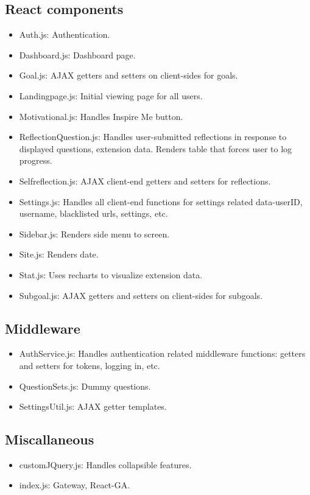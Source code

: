 \documentclass[letterpaper, 10 pt]{report}
\begin{document}
\subsection{React components}
\begin{itemize}
\item Auth.js: Authentication.
\item Dashboard.js: Dashboard page.
\item Goal.js: AJAX getters and setters on client-sides for goals.
\item Landingpage.js: Initial viewing page for all users.
\item Motivational.js: Handles Inspire Me button.
\item ReflectionQuestion.js: Handles user-submitted reflections in response to displayed questions, extension data. Renders table that forces user to log progress.
\item Selfreflection.js: AJAX client-end getters and setters for reflections.
\item Settings.js: Handles all client-end functions for settings related data-userID, username, blacklisted urls, settings, etc.
\item Sidebar.js: Renders side menu to screen.
\item Site.js: Renders date.
\item Stat.js: Uses recharts to visualize extension data.
\item Subgoal.js: AJAX getters and setters on client-sides for subgoals.
\end{itemize}

\subsection{Middleware}
\begin{itemize}
\item AuthService.js: Handles authentication related middleware functions: getters and setters for tokens, logging in, etc.
\item QuestionSets.js: Dummy questions.
\item SettingsUtil.js: AJAX getter templates.
\end{itemize}

\subsection{Miscallaneous}
\begin{itemize}
\item customJQuery.js: Handles collapsible features.
\item index.js: Gateway, React-GA.
\end{itemize}
\newpage
\end{document}
